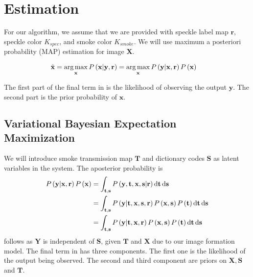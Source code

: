 \chapter{Estimation}

For our algorithm, we assume that we are provided with speckle label map $\mathbf{r}$, speckle color $K_{spec}$, and smoke color $K_{smoke}$. We will use maximum a posteriori probability (MAP) estimation for image $\mathbf{X}$.

\begin{align}
\hat{\mathbf{x}} &= \operatorname*{arg\,max}_\mathbf{x} P \left( \mathbf{x} | \mathbf{y}, \mathbf{r} \right) = \operatorname*{arg\,max}_\mathbf{x} P \left( \mathbf{y} | \mathbf{x}, \mathbf{r} \right) P \left( \mathbf{x} \right) \label{eqn:simplemap}
\end{align}

The first part of the final term in  is the likelihood of observing the output $\mathbf{y}$. The second part is the prior probability of $\mathbf{x}$.


\section{Variational Bayesian Expectation Maximization}
We will introduce smoke transmission map $\mathbf{T}$ and dictionary codes $\mathbf{S}$ as latent variables in the system. The aposterior probability is 
\begin{align}
P \left( \mathbf{y} | \mathbf{x}, \mathbf{r} \right) P \left( \mathbf{x} \right) &= \int_{\mathbf{t}, \mathbf{s} } P \left( \mathbf{y}, \mathbf{t}, \mathbf{x}, \mathbf{s} | \mathbf{r} \right)  \mathop{}\!\mathrm{d}\mathbf{t} \mathop{}\!\mathrm{d} \mathbf{s} \\
&= \int_{\mathbf{t}, \mathbf{s}} P \left( \mathbf{y} | \mathbf{t}, \mathbf{x}, \mathbf{s},  \mathbf{r} \right)  P \left(\mathbf{x}, \mathbf{s} \right) P \left( \mathbf{t} \right) \mathop{}\!\mathrm{d}\mathbf{t} \mathop{}\!\mathrm{d} \mathbf{s} \label{eqn:mapDerive1}\\
&= \int_{\mathbf{t}, \mathbf{s}} P \left( \mathbf{y} | \mathbf{t}, \mathbf{x},  \mathbf{r} \right)  P \left(\mathbf{x}, \mathbf{s} \right) P \left( \mathbf{t} \right) \mathop{}\!\mathrm{d}\mathbf{t} \mathop{}\!\mathrm{d} \mathbf{s} \label{eqn:mapDerive2}
\end{align}
 follows as $\mathbf{Y}$ is independent of $\mathbf{S}$, given $\mathbf{T}$ and $\mathbf{X}$ due to our image formation model.
The final term in  has three components. The first one is the likelihood of the output being observed. The second and third component are priors on $\mathbf{X}, \mathbf{S}$ and $\mathbf{T}$.

